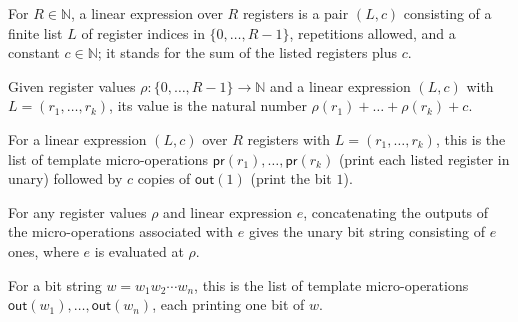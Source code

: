 \begin{definition}
\label{Complexity.CounterProg.LinE}
\leanok
For $R \in \mathbb{N}$, a linear expression over $R$ registers is a pair
$(L, c)$ consisting of a finite list $L$ of register indices in
$\{0, \dots, R-1\}$, repetitions allowed, and a constant $c \in \mathbb{N}$; it
stands for the sum of the listed registers plus $c$.
\end{definition}

\begin{definition}
\label{Complexity.CounterProg.LinE.val}
\leanok
{}
Given register values $\rho : \{0,\dots,R-1\} \to \mathbb{N}$ and a linear
expression $(L, c)$ with $L = (r_1, \dots, r_k)$, its value is the natural number
$\rho(r_1) + \dots + \rho(r_k) + c$.
\end{definition}

\begin{definition}
\label{Complexity.CounterProg.linOps}
\leanok
{}
For a linear expression $(L, c)$ over $R$ registers with $L = (r_1, \dots, r_k)$,
this is the list of template micro-operations $\mathsf{pr}(r_1), \dots,
\mathsf{pr}(r_k)$ (print each listed register in unary) followed by $c$ copies of
$\mathsf{out}(1)$ (print the bit $1$).
\end{definition}

\begin{theorem}
\label{Complexity.CounterProg.flatMap_exec_linOps}
\leanok
{}
For any register values $\rho$ and linear expression $e$, concatenating the outputs of
the micro-operations associated with $e$ gives the unary bit string consisting of $e$
ones, where $e$ is evaluated at $\rho$.
\end{theorem}

\begin{definition}
\label{Complexity.CounterProg.bitsOps}
\leanok
{}
For a bit string $w = w_1 w_2 \cdots w_n$, this is the list of template
micro-operations $\mathsf{out}(w_1), \dots, \mathsf{out}(w_n)$, each printing one
bit of $w$.
\end{definition}

